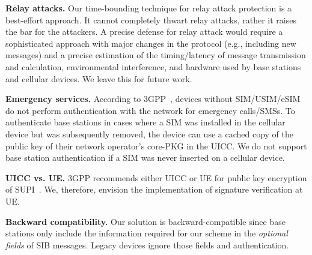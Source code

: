 \noindent\textbf{Relay attacks.} Our time-bounding technique for relay attack protection is a best-effort approach. It cannot completely thwart relay attacks, rather it raises the bar for the attackers. A precise defense for relay attack would require a sophisticated approach with major changes in the protocol (e.g., including new messages) and a precise estimation of the timing/latency of message transmission and calculation, environmental interference, and hardware used by base stations and
cellular devices. We leave this for future work.

\noindent\textbf{Emergency services.} According to 3GPP~\cite{3GPP:33.501}, devices without SIM/USIM/eSIM do not perform authentication with the network for emergency calls/SMSs. To authenticate base stations in cases where a SIM was installed in the cellular device but was subsequently removed, the device can use a cached copy of the public key of their network operator's core-PKG in the UICC. We do not support base station authentication if a SIM was never inserted on a cellular device.

\noindent\textbf{UICC vs. UE.} 3GPP recommends either UICC or UE for public key encryption of SUPI~\cite{3GPP:33.501}. We, therefore, envision the implementation of signature verification at UE.

\noindent\textbf{Backward compatibility.} Our solution is backward-compatible since base stations only include the information required for our scheme in the \emph{optional fields} of SIB messages. Legacy devices ignore those fields and authentication.